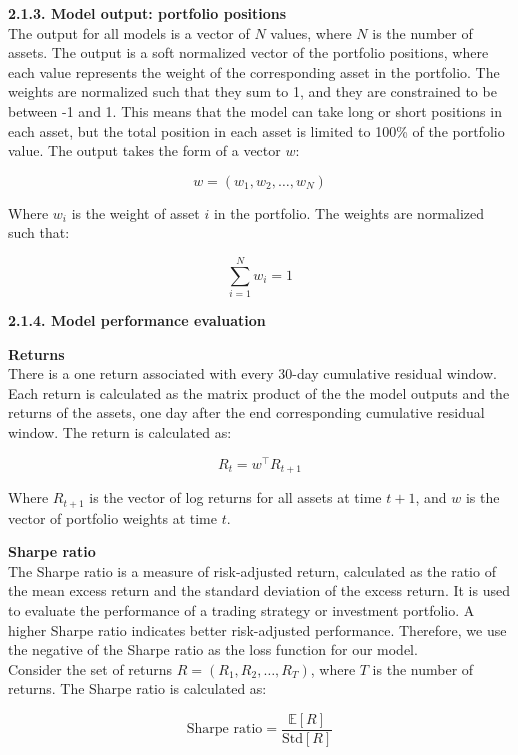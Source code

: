 \documentclass[12pt]{article}
\begin{document}
\textbf{2.1.3. Model output: portfolio positions}
\\
The output for all models is a vector of $N$ values, where $N$ is the number of assets. The output is a soft normalized vector of the portfolio positions, where each value represents the weight of the corresponding asset in the portfolio. The weights are normalized such that they sum to 1, and they are constrained to be between -1 and 1. This means that the model can take long or short positions in each asset, but the total position in each asset is limited to 100\% of the portfolio value. The output takes the form of a vector $w$:

\[
w = (w_1, w_2, \ldots, w_N)
\]


Where $w_i$ is the weight of asset $i$ in the portfolio. The weights are normalized such that:

\[
\sum_{i=1}^{N} w_i = 1
\]

\vspace{20pt}

\textbf{2.1.4. Model performance evaluation} 

\textbf{Returns}
\\
There is a one return associated with every 30-day cumulative residual window. Each return is calculated as the matrix product of the the model outputs and the returns of the assets, one day after the end corresponding cumulative residual window. The return is calculated as:

\[
R_t = w^\top R_{t+1}
\]

Where $R_{t+1}$ is the vector of log returns for all assets at time $t+1$, and $w$ is the vector of portfolio weights at time $t$. 

\vspace{20pt}

\textbf{Sharpe ratio}
\\
The Sharpe ratio is a measure of risk-adjusted return, calculated as the ratio of the mean excess return and the standard deviation of the excess return. It is used to evaluate the performance of a trading strategy or investment portfolio. A higher Sharpe ratio indicates better risk-adjusted performance. Therefore, we use the negative of the Sharpe ratio as the loss function for our model. 
\\
Consider the set of returns $R = (R_1, R_2, \ldots, R_T)$, where $T$ is the number of returns. The Sharpe ratio is calculated as:

\[
\text{Sharpe ratio} = \frac{\mathbb{E}[R]}{\text{Std}[R]}
\]
\end{document}

